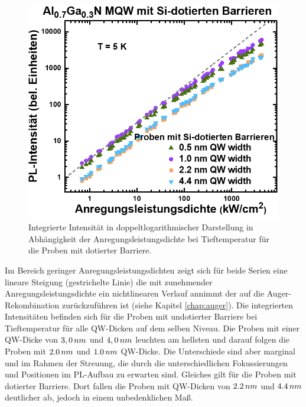 \begin{figure}[H]
\begin{minipage}[t]{0.49\textwidth}
    \includegraphics[width=\linewidth]{Bilder/MQWdickenSerie/intTTdotierte.png}
		\caption{Integrierte Intensität in doppeltlogarithmischer Darstellung in Abhängigkeit der Anregungsleistungsdichte bei Tieftemperatur für die Proben mit dotierter Barriere.}
    \label{fig:dotiertint}
  \end{minipage}
\end{figure}
\noindent 
Im Bereich geringer Anregungsleistungsdichten zeigt sich für beide Serien eine lineare Steigung (gestrichelte Linie) die mit zunehmender Anregungsleistungsdichte ein nichtlinearen Verlauf annimmt der auf die Auger-Rekombination zurückzuführen ist (siehe Kapitel \ref{chap:auger}).
Die integrierten Intensitäten befinden sich für die Proben mit undotierter Barriere bei Tieftemperatur für alle QW-Dicken auf dem selben Niveau.
\newline
Die Proben mit einer QW-Dicke von $3,0 \thinspace nm$ und $4,0 \thinspace nm$ leuchten am hellsten und darauf folgen die Proben mit $2.0 \thinspace nm$ und $1.0 \thinspace nm$  QW-Dicke. Die Unterschiede sind aber marginal und im Rahmen der Streuung, die durch die unterschiedlichen Fokussierungen und Positionen im PL-Aufbau zu erwarten sind. Gleiches gilt für die Proben mit dotierter Barriere. Dort fallen die Proben mit QW-Dicken von $2.2 \thinspace nm$ und $4.4 \thinspace nm$ deutlicher ab, jedoch in einem unbedenklichen Maß.   
